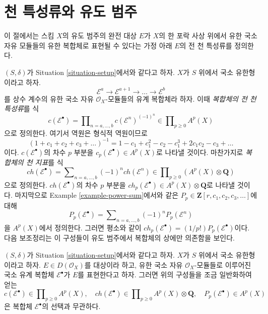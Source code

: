 \section{천 특성류와 유도 범주}
\label{section-pre-derived}

\noindent
이 절에서는 스킴 $X$의 유도 범주의 완전 대상 $E$가 $X$의 한 포락
사상 위에서 유한 국소 자유 모듈들의 유한 복합체로 표현될 수 있다는
가정 아래 $E$의 전 천 특성류를 정의한다.

\medskip\noindent
$(S, \delta)$가 Situation \ref{situation-setup}에서와 같다고 하자.
$X$가 $S$ 위에서 국소 유한형이라고 하자.
$$
\mathcal{E}^a \to \mathcal{E}^{a + 1} \to \ldots \to \mathcal{E}^b
$$
를 상수 계수의 유한 국소 자유 $\mathcal{O}_X$-모듈들의 유계
복합체라 하자. 이때 {\it 복합체의 전 천 특성류}를 식
$$
c(\mathcal{E}^\bullet) = \prod\nolimits_{n = a, \ldots, b}
c(\mathcal{E}^n)^{(-1)^n} \in \prod\nolimits_{p \geq 0} A^p(X)
$$
으로 정의한다. 여기서 역원은 형식적 역원이므로
$$
(1 + c_1 + c_2 + c_3 + \ldots)^{-1} =
1 - c_1 + c_1^2 - c_2 - c_1^3 + 2c_1 c_2 - c_3 + \ldots
$$
이다. $c(\mathcal{E}^\bullet)$의 차수 $p$ 부분을
$c_p(\mathcal{E}^\bullet) \in A^p(X)$로 나타낼 것이다. 마찬가지로
{\it 복합체의 천 지표}를 식
$$
ch(\mathcal{E}^\bullet) = \sum\nolimits_{n = a, \ldots, b}
(-1)^n ch(\mathcal{E}^n) \in
\prod\nolimits_{p \geq 0} (A^p(X) \otimes \mathbf{Q})
$$
으로 정의한다. $ch(\mathcal{E}^\bullet)$의 차수 $p$ 부분을
$ch_p(\mathcal{E}^\bullet) \in A^p(X) \otimes \mathbf{Q}$로 나타낼
것이다. 마지막으로 Example \ref{example-power-sum}에서와 같은
$P_p \in \mathbf{Z}[r, c_1, c_2, c_3, \ldots]$에 대해
$$
P_p(\mathcal{E}^\bullet) = \sum\nolimits_{n = a, \ldots, b}
(-1)^n P_p(\mathcal{E}^n)
$$
을 $A^p(X)$에서 정의한다. 그러면 평소와 같이
$ch_p(\mathcal{E}^\bullet) = (1/p!)P_p(\mathcal{E}^\bullet)$이다.
다음 보조정리는 이 구성들이 유도 범주에서 복합체의 상에만 의존함을
보인다.

\begin{lemma}
\label{lemma-pre-derived-chern-class}
$(S, \delta)$가 Situation \ref{situation-setup}에서와 같다고 하자.
$X$가 $S$ 위에서 국소 유한형이라고 하자.
$E \in D(\mathcal{O}_X)$를 대상이라 하고, 유한 국소 자유
$\mathcal{O}_X$-모듈들로 이루어진 국소 유계 복합체
$\mathcal{E}^\bullet$가 $E$를 표현한다고 하자. 그러면 위의 구성들을
조금 일반화하여 얻는
$$
c(\mathcal{E}^\bullet) \in \prod\nolimits_{p \geq 0} A^p(X),\quad
ch(\mathcal{E}^\bullet) \in
\prod\nolimits_{p \geq 0} A^p(X) \otimes \mathbf{Q},\quad
P_p(\mathcal{E}^\bullet) \in A^p(X)
$$
은 복합체 $\mathcal{E}^\bullet$의 선택과 무관하다.
\end{lemma}

